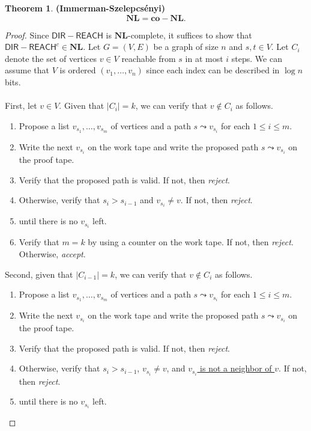 \documentclass[10pt,letterpaper,cm]{nupset}
\theoremstyle{definition}
\newtheorem{theorem}{Theorem}
\newcommand{\1}{\mathbf{1}}
\newcommand{\0}{\vec 0}
\begin{document}
\begin{theorem}{\textbf{(Immerman-Szelepcs\'enyi)}}
$$\mathbf{NL} = \mathbf{co}{-}{\mathbf{NL}}.$$
\end{theorem}
\begin{proof}
Since $\mathsf{DIR{-}REACH}$ is $\mathbf{NL}$-complete, it suffices to show that $\mathsf{DIR{-}REACH}^c\in \mathbf{NL}.$  
Let $G= (V,E)$ be a graph of size $n$ and $s, t\in V$. Let $C_i$ denote the set of vertices $v\in V$ reachable from $s$ in at most $i$ steps. We can assume that $V$ is ordered $(v_1, \ldots, v_n)$ since each index can be described in $\log{n}$ bits.
\\ \\ First, let $v\in V$. Given that $|C_i| = k$, we can verify that $v \notin C_i$ as follows. 
\begin{enumerate}
\item Propose a list $v_{s_1}, \ldots, v_{s_m}$ of vertices and a path $s\leadsto v_{s_i}$ for each $1\leq i \leq m$. 
\item Write the next $v_{s_i}$ on the work tape and write the proposed path $s \leadsto v_{s_i}$ on the proof tape. 
\item Verify that the proposed path is valid. If not, then \textit{reject}.
\item Otherwise, verify that $s_i > s_{i-1}$ and $v_{s_i} \ne v$. If not, then \textit{reject}. 
\item {} until there is no $v_{s_i}$ left. 
\item Verify that $m = k$ by using a counter on the work tape. If not, then \textit{reject}. Otherwise, \textit{accept}.
\end{enumerate}
Second, given that $|C_{i-1}| = k$,  we can verify that $v\notin C_i$ as follows.
\begin{enumerate}
\item Propose a list $v_{s_1}, \ldots, v_{s_m}$ of vertices and a path $s\leadsto v_{s_i}$ for each $1\leq i \leq m$. 
\item Write the next $v_{s_i}$ on the work tape and write the proposed path $s \leadsto v_{s_i}$ on the proof tape. 
\item Verify that the proposed path is valid. If not, then \textit{reject}.
\item Otherwise, verify that $s_i > s_{i-1}$, $v_{s_i} \ne v$, and \underline{$v_{s_i}$ is not a neighbor of $v$}. If not, then \textit{reject}. 
\item {} until there is no $v_{s_i}$ left. 

\end{enumerate}
\end{proof}
\end{document}
